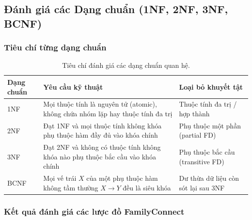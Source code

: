 \subsection{Đánh giá các Dạng chuẩn (1NF, 2NF, 3NF, BCNF)}
\label{subsec:2_3_2_danh_gia_dang_chuan}

\subsubsection{Tiêu chí từng dạng chuẩn}

\begin{table}[htbp]
\centering
\small
\caption{Tiêu chí đánh giá các dạng chuẩn quan hệ.}
\label{tab:dang_chuan_tieu_chi}
\begin{tabularx}{\textwidth}{|l|X|X|}
\hline
\textbf{Dạng chuẩn} & \textbf{Yêu cầu kỹ thuật} & \textbf{Loại bỏ khuyết tật} \\ \hline
1NF & Mọi thuộc tính là nguyên tử (atomic), không chứa nhóm lặp hay thuộc tính đa trị & Thuộc tính đa trị / hợp thành \\ \hline
2NF & Đạt 1NF và mọi thuộc tính không khóa phụ thuộc hàm đầy đủ vào khóa chính & Phụ thuộc một phần (partial FD) \\ \hline
3NF & Đạt 2NF và không có thuộc tính không khóa nào phụ thuộc bắc cầu vào khóa chính & Phụ thuộc bắc cầu (transitive FD) \\ \hline
BCNF & Mọi vế trái $X$ của một phụ thuộc hàm không tầm thường $X \rightarrow Y$ đều là siêu khóa & Dư thừa dữ liệu còn sót lại sau 3NF \\ \hline
\end{tabularx}
\end{table}

\subsubsection{Kết quả đánh giá các lược đồ FamilyConnect}

